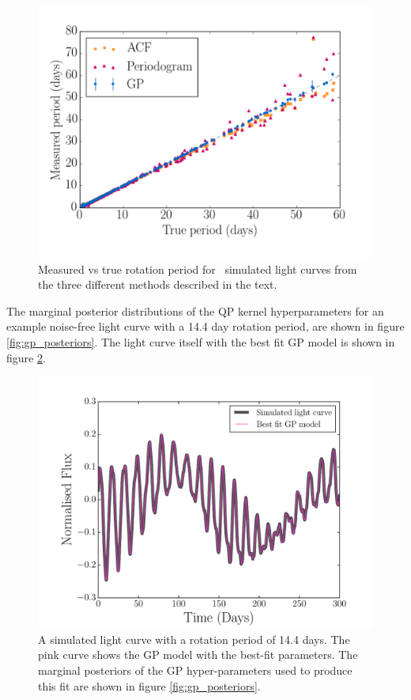 \begin{figure}
\begin{center}
\includegraphics[width=6in, clip=true]{figures/compare2.pdf}
\caption[All results.]
{Measured vs true rotation period for \nlightcurves\ simulated light
curves from the three different methods described in the text.}
\label{fig:compare_noise_free}
\end{center}
\end{figure}

The marginal posterior distributions of the QP kernel hyperparameters for an
example noise-free light curve  with a 14.4 day rotation period, are shown in
figure \ref{fig:gp_posteriors}.
The light curve itself with the best fit GP model is shown in figure
\ref{fig:demo_lc_GP}.

\begin{figure}
\begin{center}
\includegraphics[width=6in, clip=true]{figures/demo_lc_GP.pdf}
\caption{A simulated light curve with a rotation period of 14.4 days.
The pink curve shows the GP model with the best-fit parameters.
The marginal posteriors of the GP hyper-parameters used to produce this fit
are shown in figure \ref{fig:gp_posteriors}.}
\label{fig:demo_lc_GP}
\end{center}
\end{figure}

